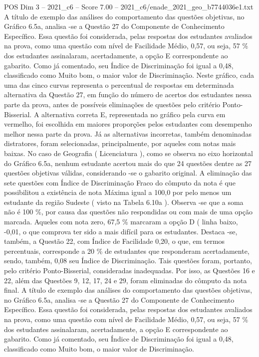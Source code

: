 \begin{textsample}{POS Dim 3 – 2021\_c6 – Score 7.00 – 2021\_c6/enade\_2021\_geo\_b7744036e1.txt}
A título de exemplo das análises do comportamento das questões objetivas, no Gráfico 6.5a, analisa -se a Questão 27 do Componente de Conhecimento Específico.
Essa questão foi considerada, pelas respostas dos estudantes avaliados na prova, como uma questão com nível de Facilidade Médio, 0,57, ou seja, 57 \% dos estudantes assinalaram, acertadamente, a opção E correspondente ao gabarito.
Como já comentado, seu Índice de Discriminação foi igual a 0,48, classificado como Muito bom, o maior valor de Discriminação.
Neste gráfico, cada uma das cinco curvas representa o percentual de respostas em determinada alternativa da Questão 27, em função do número de acertos dos estudantes nessa parte da prova, antes de possíveis eliminações de questões pelo critério Ponto-Bisserial.
A alternativa correta E, representada no gráfico pela curva em vermelho, foi escolhida em maiores proporções pelos estudantes com desempenho melhor nessa parte da prova.
Já as alternativas incorretas, também denominadas distratores, foram selecionadas, principalmente, por aqueles com notas mais baixas.
No caso de Geografia ( Licenciatura ), como se observa no eixo horizontal do Gráfico 6.5a, nenhum estudante acertou mais do que 24 questões dentre as 27 questões objetivas válidas, considerando -se o gabarito original.
A eliminação das sete questões com Índice de Discriminação Fraco do cômputo da nota é que possibilitou a existência de nota Máxima igual a 100,0 por pelo menos um estudante da região Sudeste ( visto na Tabela 6.10a ).
Observa -se que a soma não é 100 \%, por causa das questões não respondidas ou com mais de uma opção marcada.
Aqueles com nota zero, 67,5 \% marcaram a opção D ( linha baixo, -0,01, o que comprova ter sido a mais difícil para os estudantes.
Destaca -se, também, a Questão 22, com Índice de Facilidade 0,20, o que, em termos percentuais, corresponde a 20 \% de estudantes que responderam acertadamente, sendo, também, 0,08 seu Índice de Discriminação.
Tais questões foram, portanto, pelo critério Ponto-Bisserial, consideradas inadequadas.
Por isso, as Questões 16 e 22, além das Questões 9, 12, 17, 24 e 29, foram eliminadas do cômputo da nota final.
A título de exemplo das análises do comportamento das questões objetivas, no Gráfico 6.5a, analisa -se a Questão 27 do Componente de Conhecimento Específico.
Essa questão foi considerada, pelas respostas dos estudantes avaliados na prova, como uma questão com nível de Facilidade Médio, 0,57, ou seja, 57 \% dos estudantes assinalaram, acertadamente, a opção E correspondente ao gabarito.
Como já comentado, seu Índice de Discriminação foi igual a 0,48, classificado como Muito bom, o maior valor de Discriminação.

\end{textsample}
